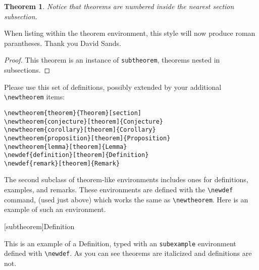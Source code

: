 \documentclass[acmtocl]{acmtrans2m}
\begin{document}
\newtheorem{subtheorem}{Theorem}[subsection]
\begin{subtheorem}
Notice that theorems are numbered inside the nearest section\newline 
subsection.
\end{subtheorem}

When listing within the theorem environment, this style will now 
produce
roman parantheses. Thank you David Sands.

\begin{proof}   
This theorem is an instance of {\tt subtheorem}, theorems nested in
subsections.
\end{proof}




Please use this set of definitions, possibly extended by your
additional \verb|\newtheorem| items:

\begin{verbatim}
\newtheorem{theorem}{Theorem}[section]
\newtheorem{conjecture}[theorem]{Conjecture}
\newtheorem{corollary}[theorem]{Corollary}
\newtheorem{proposition}[theorem]{Proposition}
\newtheorem{lemma}[theorem]{Lemma}
\newdef{definition}[theorem]{Definition}
\newdef{remark}[theorem]{Remark}
\end{verbatim}

The second subclass of theorem-like environments includes ones for
definitions, examples, and remarks.  These environments are defined
with the \verb|\newdef| command, (used just above)
which works the same as \verb|\newtheorem|.  Here
is an example of such an environment.

[subtheorem]{Definition}

\begin{subexample}
This is an example of a Definition, typed with an {\tt subexample}
environment defined with \verb|\newdef|.
As you can see theorems are italicized and definitions are not.
\end{subexample}

\newtheorem{subproperty}[subtheorem]{Property}
\end{document}
